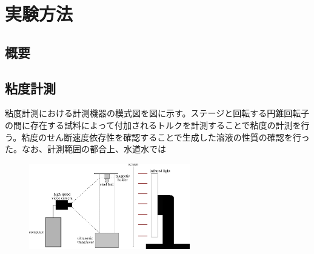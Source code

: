 \chapter{実験方法}
\section{概要}
\section{粘度計測}
粘度計測における計測機器の模式図を図に示す。ステージと回転する円錐回転子の間に存在する試料によって付加されるトルクを計測することで粘度の計測を行う。粘度のせん断速度依存性を確認することで生成した溶液の性質の確認を行った。なお、計測範囲の都合上、水道水では

\begin{figure}[htp]
    \includegraphics[clip,width=7.0cm]{2-Methods/device.png}
\end{figure}